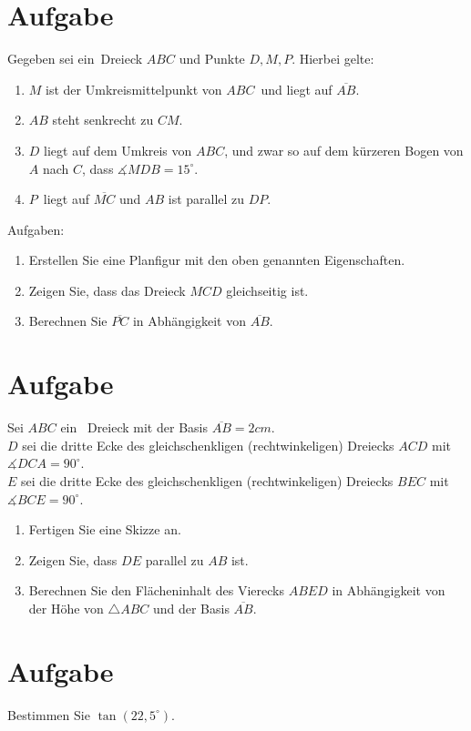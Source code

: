 \documentclass[a4paper,10pt]{article}
\begin{document}
\section{Aufgabe}
Gegeben sei ein Dreieck $ABC$ und Punkte $D,M,P$. Hierbei gelte:
\begin{enumerate}
\item $M$ ist der Umkreismittelpunkt von $ABC$ und liegt auf $\overline{AB}$.
\item $AB$ steht senkrecht zu $CM$.
\item $D$ liegt auf dem Umkreis von $ABC$, und zwar so auf dem kürzeren Bogen von $A$ nach $C$, dass $\measuredangle MDB=15^\circ$.
\item $P$ liegt auf $\overline{MC}$ und $AB$ ist parallel zu $DP$.
\end{enumerate}
Aufgaben:
\begin{enumerate}[label=\alph*)]
\item Erstellen Sie eine Planfigur mit den oben genannten Eigenschaften.
\item Zeigen Sie, dass das Dreieck $MCD$ gleichseitig ist.
\item Berechnen Sie $\overline{PC}$ in Abhängigkeit von $\overline{AB}$.
\end{enumerate}

\section{Aufgabe}
Sei $ABC$ ein  Dreieck mit der Basis $\overline{AB} = 2cm$.\\
$D$ sei die dritte Ecke des gleichschenkligen (rechtwinkeligen) Dreiecks $ACD$ mit $\measuredangle DCA=90^\circ$.\\
$E$ sei die dritte Ecke des gleichschenkligen (rechtwinkeligen) Dreiecks $BEC$ mit $\measuredangle BCE=90^\circ$.
\begin{enumerate}[label=\alph*)]
\item Fertigen Sie eine Skizze an.
\item Zeigen Sie, dass $DE$ parallel zu $AB$ ist.
\item Berechnen Sie den Flächeninhalt des Vierecks $ABED$ in Abhängigkeit von der Höhe von $\triangle ABC$ und der Basis $\overline{AB}$.
\end{enumerate}

\section{Aufgabe}
Bestimmen Sie $\tan(22,5^\circ)$.
\end{document}

